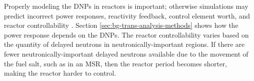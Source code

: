 Properly modeling the \glspl{DNP} in reactors is important; otherwise simulations may predict incorrect power responses, reactivity feedback, control element worth, and reactor controllability \cite{das1993importance, das1977kinetics, lane1958fluid}.
Section \ref{sec:bg-trans-analysis-methods} shows how the power response depends on the \glspl{DNP}.
The reactor controllability varies based on the quantity of delayed neutrons in neutronically-important regions.
If there are fewer neutronically-important delayed neutrons available due to the movement of the fuel salt, such as in an \gls{MSR}, then the reactor period becomes shorter, making the reactor harder to control.